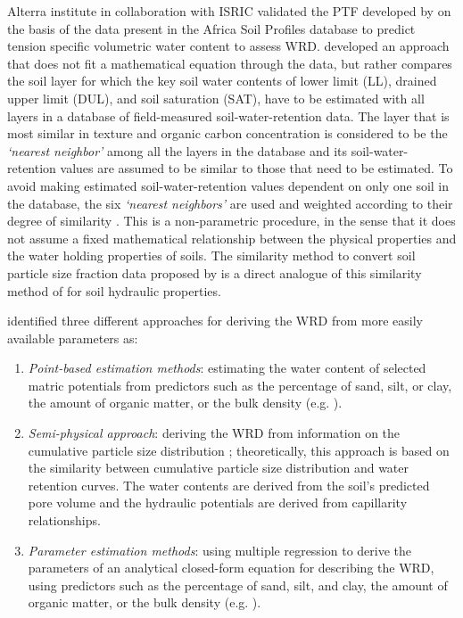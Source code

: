 \documentclass[11pt]{krantz}
\theoremstyle{definition}
\theoremstyle{definition}
\theoremstyle{definition}
\theoremstyle{remark}
\begin{document}
Alterra institute in collaboration with ISRIC validated the PTF
developed by \citet{hodnett2002marked} on the basis of the data present
in the Africa Soil Profiles database \citep{Leenaars2012} to predict
tension specific volumetric water content \citep{wosten2013soil} to
assess WRD. \citet{Jagtap2004TASAE} developed an approach that does not
fit a mathematical equation through the data, but rather compares the
soil layer for which the key soil water contents of lower limit (LL),
drained upper limit (DUL), and soil saturation (SAT), have to be
estimated with all layers in a database of field-measured
soil-water-retention data. The layer that is most similar in texture and
organic carbon concentration is considered to be the \emph{`nearest
neighbor'} among all the layers in the database and its
soil-water-retention values are assumed to be similar to those that need
to be estimated. To avoid making estimated soil-water-retention values
dependent on only one soil in the database, the six \emph{`nearest
neighbors'} are used and weighted according to their degree of
similarity \citep{Jagtap2004TASAE}. This is a non-parametric procedure,
in the sense that it does not assume a fixed mathematical relationship
between the physical properties and the water holding properties of
soils. The similarity method to convert soil particle size fraction data
proposed by \citeauthor{Nemes1999G}
\citetext{\citeyear{Nemes1999G}; \citealp{Nemes1999}} is a direct
analogue of this similarity method of \citet{Jagtap2004TASAE} for soil
hydraulic properties.

\citet{Zacharias2007SSSAJ} identified three different approaches for
deriving the WRD from more easily available parameters as:

\begin{enumerate}
\def\labelenumi{\arabic{enumi}.}
\item
  \emph{Point-based estimation methods}: estimating the water content of
  selected matric potentials from predictors such as the percentage of
  sand, silt, or clay, the amount of organic matter, or the bulk density
  (e.g. \citet{Rawls1982JIDDASCE}).
\item
  \emph{Semi-physical approach}: deriving the WRD from information on
  the cumulative particle size distribution \citep{Arya1981SSSAJ};
  theoretically, this approach is based on the similarity between
  cumulative particle size distribution and water retention curves. The
  water contents are derived from the soil's predicted pore volume and
  the hydraulic potentials are derived from capillarity relationships.
\item
  \emph{Parameter estimation methods}: using multiple regression to
  derive the parameters of an analytical closed-form equation for
  describing the WRD, using predictors such as the percentage of sand,
  silt, and clay, the amount of organic matter, or the bulk density
  (e.g. \citeauthor{van1980closed}
  \citetext{\citeyear{van1980closed}; \citealp{Wosten1999G}; \citealp{wosten2013soil}}).
\end{enumerate}
\end{document}
